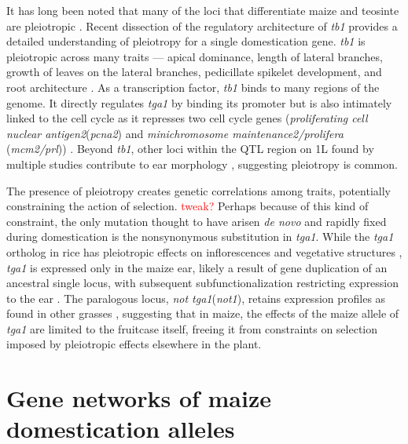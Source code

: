 \documentclass[9pt,twocolumn,twoside]{rilabRxiv}
\newcommand{\jri}[1]{{\small \textcolor{red}{#1}}}
\begin{document}
It has long been noted that many of the loci that differentiate maize and teosinte are pleiotropic \citep{collins1920, beadle1939, mangelsdorf1939, langham1940}.
Recent dissection of the regulatory architecture of \textit{tb1} provides a detailed understanding of pleiotropy for a single domestication gene.
\textit{tb1} is pleiotropic across many traits --- apical dominance, length of lateral branches, growth of leaves on the lateral branches, pedicillate spikelet development, and root architecture \citep{hubbard2002, gaudin2014}.
As a transcription factor, \textit{tb1} binds to many regions of the genome.
It directly regulates \textit{tga1} by binding its promoter but is also intimately linked to the cell cycle as it represses two cell cycle genes (\textit{proliferating cell nuclear antigen2}(\textit{pcna2}) and \textit{minichromosome maintenance2/prolifera} (\textit{mcm2/prl})) \citep{studer2017}.
Beyond \textit{tb1}, other loci within the QTL region on 1L found by multiple studies \citep{doebley1991, doebley1993, briggs2007} contribute to ear morphology \citep{studer2011fract, yang2016}, suggesting pleiotropy is common.

The presence of pleiotropy creates genetic correlations among traits, potentially constraining the action of selection. \jri{tweak?}
Perhaps because of this kind of constraint, the only mutation thought to have arisen \textit{de novo} and rapidly fixed during domestication is the nonsynonymous substitution in \textit{tga1}.
While the \textit{tga1} ortholog in rice has pleiotropic effects on inflorescences and vegetative structures \citep{preston2012, wang2015}, \textit{tga1} is expressed only in the maize ear, likely a result of gene duplication of an ancestral single locus, with subsequent subfunctionalization  restricting expression to the ear \citep{preston2012, wang2015}.
The paralogous locus, \textit{not tga1}(\textit{not1}), retains expression profiles as found in other grasses \citep{wang2011, wang2012}, suggesting that in maize, the effects of the maize allele of \textit{tga1} are limited to the fruitcase itself, freeing it from constraints on selection imposed by pleiotropic effects elsewhere in the plant.

\section*{Gene networks of maize domestication alleles}
\end{document}
